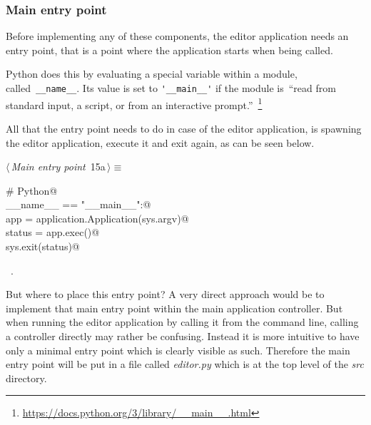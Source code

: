 \documentclass[
    a4paper,      %
    10pt,         %
    openright,    %
    notitlepage,  %
    parskip=half, %
]{scrreprt}       %
\theoremstyle{definition}                    %
\begin{document}

\subsubsection{Main entry point}
\label{ssubsec:main-entry-point}

Before implementing any of these components, the editor application needs an
entry point, that is a point where the application starts when being called.

Python does this by evaluating a special variable within a module,
called~\verb+__name__+. Its value is set to \verb+'__main__'+ if the module
is~\enquote{read from standard input, a script, or from an interactive
prompt.}~\footnote{\url{https://docs.python.org/3/library/__main__.html}}

All that the entry point needs to do in case of the editor application, is
spawning the editor application, execute it and exit again, as can be seen below.

\begin{flushleft} \small
\begin{minipage}{\linewidth}\label{scrap1}\raggedright\small
{} $\langle\,${\itshape Main entry point}\nobreak\ {\footnotesize {15a}}$\,\rangle\equiv$
\vspace{-1ex}
\begin{list}{}{} \item
\mbox{}\lstinline@# Python@\\
\mbox{}\lstinline@if __name__ == "__main__":@\\
\mbox{}\lstinline@    app = application.Application(sys.argv)@\\
\mbox{}\lstinline@    status = app.exec()@\\
\mbox{}\lstinline@    sys.exit(status)@\\
\mbox{}\lstinline@@{\NWsep}
\end{list}
\vspace{-1.5ex}
\footnotesize
\begin{list}{}{\setlength{\itemsep}{-\parsep}\setlength{\itemindent}{-\leftmargin}}
\item \NWtxtMacroRefIn\ .

\item{}
\end{list}
\end{minipage}\vspace{4ex}
\end{flushleft}
But where to place this entry point? A very direct approach would be to
implement that main entry point within the main application controller. But when
running the editor application by calling it from the command line, calling a
controller directly may rather be confusing. Instead it is more intuitive to
have only a minimal entry point which is clearly visible as such. Therefore the
main entry point will be put in a file called \textit{editor.py} which is at the
top level of the \textit{src} directory.
\end{document}
